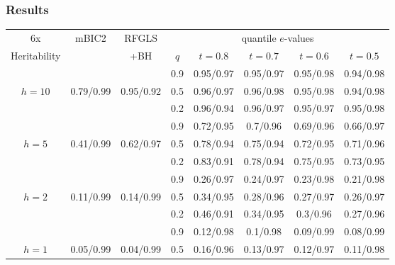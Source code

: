 
\subsubsection{Results}
\begin{table}
\begin{footnotesize}
\centering
    \begin{tabular}{c|c|c|c|cccc}
    \hline
     6x   & mBIC2       & RFGLS  & \multicolumn{5}{|c}{quantile $e$-values}    \\\cline{4-8}
    Heritability    &           & +BH		 & $q$    & $t=0.8$     & $t=0.7$     & $t=0.6$     & $t=0.5$     \\ \hline
    ~    & ~         & ~         & 0.9      & 0.95/0.97 & 0.95/0.97 & 0.95/0.98 & 0.94/0.98 \\
    $h=10$ & 0.79/0.99 & 0.95/0.92 & 0.5      & 0.96/0.97 & 0.96/0.98 & 0.95/0.98 & 0.94/0.98 \\
    ~    & ~         & ~         & 0.2      & 0.96/0.94 & 0.96/0.97 & 0.95/0.97 & 0.95/0.98 \\\hline
    ~    & ~         & ~         & 0.9      & 0.72/0.95 & 0.7/0.96  & 0.69/0.96 & 0.66/0.97 \\
    $h=5$  & 0.41/0.99 & 0.62/0.97 & 0.5      & 0.78/0.94 & 0.75/0.94 & 0.72/0.95 & 0.71/0.96 \\
    ~    & ~         & ~         & 0.2      & 0.83/0.91 & 0.78/0.94 & 0.75/0.95 & 0.73/0.95 \\\hline
    ~    & ~         & ~         & 0.9      & 0.26/0.97 & 0.24/0.97 & 0.23/0.98 & 0.21/0.98 \\
    $h=2$  & 0.11/0.99 & 0.14/0.99 & 0.5      & 0.34/0.95 & 0.28/0.96 & 0.27/0.97 & 0.26/0.97 \\
    ~    & ~         & ~         & 0.2      & 0.46/0.91 & 0.34/0.95 & 0.3/0.96  & 0.27/0.96 \\\hline
    ~    & ~         & ~         & 0.9      & 0.12/0.98 & 0.1/0.98  & 0.09/0.99 & 0.08/0.99 \\
    $h=1$  & 0.05/0.99 & 0.04/0.99    & 0.5      & 0.16/0.96 & 0.13/0.97 & 0.12/0.97 & 0.11/0.98 \\

\end{tabular}
\end{footnotesize}
\end{table}
